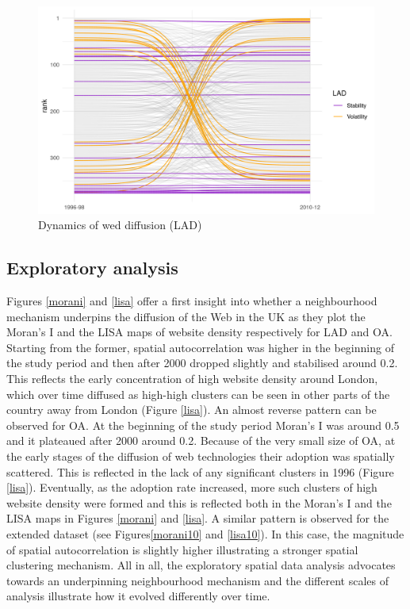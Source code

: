 \documentclass[
  authoryear,
  preprint,
  3p]{elsarticle}
\begin{document}
\begin{figure}[H]

{\centering \includegraphics[width=1\textwidth,height=\textheight]{../../outputs/ranks/web_per_firm2000_2012_only0595_av.png}

}

\caption{\label{rank}Dynamics of wed diffusion (LAD)}

\end{figure}%

\subsection{Exploratory analysis}\label{exploratory-analysis}

Figures \ref{morani} and \ref{lisa} offer a first insight into whether a
neighbourhood mechanism underpins the diffusion of the Web in the UK as
they plot the Moran's I and the LISA maps of website density
respectively for LAD and OA. Starting from the former, spatial
autocorrelation was higher in the beginning of the study period and then
after 2000 dropped slightly and stabilised around 0.2. This reflects the
early concentration of high website density around London, which over
time diffused as high-high clusters can be seen in other parts of the
country away from London (Figure \ref{lisa}). An almost reverse pattern
can be observed for OA. At the beginning of the study period Moran's I
was around 0.5 and it plateaued after 2000 around 0.2. Because of the
very small size of OA, at the early stages of the diffusion of web
technologies their adoption was spatially scattered. This is reflected
in the lack of any significant clusters in 1996 (Figure \ref{lisa}).
Eventually, as the adoption rate increased, more such clusters of high
website density were formed and this is reflected both in the Moran's I
and the LISA maps in Figures \ref{morani} and \ref{lisa}. A similar
pattern is observed for the extended dataset (see Figures\ref{morani10}
and \ref{lisa10}). In this case, the magnitude of spatial
autocorrelation is slightly higher illustrating a stronger spatial
clustering mechanism. All in all, the exploratory spatial data analysis
advocates towards an underpinning neighbourhood mechanism and the
different scales of analysis illustrate how it evolved differently over
time.
\end{document}
